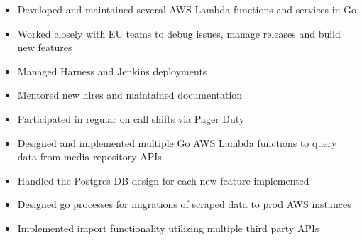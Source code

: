 \documentclass[10pt,a4paper,ragged2e]{altacv}
\begin{document}
\tagline{}


\begin{fullwidth}
\makecvheader
\end{fullwidth}



\begin{itemize}
\item Developed and maintained several AWS Lambda functions and services in Go
\item Worked closely with EU teams to debug issues, manage releases and build new features
\item Managed Harness and Jenkins deployments
\item Mentored new hires and maintained documentation
\item Participated in regular on call shifts via Pager Duty 
\end{itemize}

\divider

\begin{itemize}
\item Designed and implemented multiple Go AWS Lambda functions to query data from media repository APIs
\item Handled the Postgres DB design for each new feature implemented
\item Designed go processes for migrations of scraped data to prod AWS instances
\item Implemented import functionality utilizing multiple third party APIs
\end{itemize}
\end{document}
